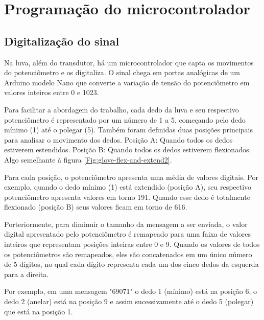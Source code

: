 \documentclass[
	12pt,				%
	openright,			%
	oneside,			%
	a4paper,			%
	english,			%
	brazil				%
	]{abntex2}
\begin{document}
	
		\section{Programação do microcontrolador}

		\subsection{Digitalização do sinal}

		Na luva, além do transdutor, há um microcontrolador que capta os movimentos do potenciômetro e os digitaliza. O sinal chega em portas analógicas de um Arduino modelo Nano que converte a variação de tensão do potenciômetro em valores inteiros entre 0 e 1023. 

		Para facilitar a abordagem do trabalho, cada dedo da luva e seu respectivo potenciômetro é representado por um número de 1 a 5, começando pelo dedo mínimo (1) até o polegar (5). 
	 Também foram definidas duas posições principais para analisar o movimento dos dedos. Posição A: Quando todos os dedos estiverem estendidos. Posição B: Quando todos os dedos estiverem flexionados. Algo semelhante à figura \ref{Fig:glove-flex-and-extend2}.

	 	Para cada posição, o potenciômetro apresenta uma média de valores digitais. Por exemplo, quando o dedo mínimo (1) está extendido (posição A), seu respectivo potenciômetro apresenta valores em torno 191. Quando esse dedo é totalmente flexionado (posição B) seus valores ficam em torno de 616. %


		Porteriormente, para diminuir o tamanho da mensagem a ser enviada, o valor digital apresentado pelo potenciômetro é remapeado para uma faixa de valores inteiros que representam posições inteiras entre 0 e 9. Quando os valores de todos os potenciômetros são remapeados, eles são concatenados em um único número de 5 dígitos, no qual cada dígito representa cada um dos cinco dedos da esquerda para a direita. 
		
		Por exemplo, em uma mensagem "69071" o dedo 1 (mínimo) está na posição 6, o dedo 2 (anelar) está na posição 9 e assim sucessivamente até o dedo 5 (polegar) que está na posição 1.
		
\end{document}
